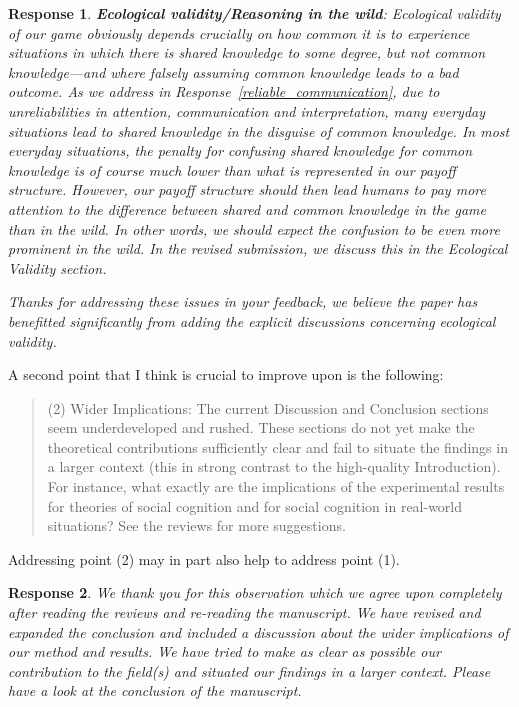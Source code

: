\documentclass[a4paper]{article}
\newtheorem{response}{Response}
\begin{document}
 \begin{response}
{\bfseries Ecological validity/Reasoning in the wild}: Ecological validity of our game obviously depends crucially on how common it is to experience situations in which there is shared knowledge to some degree, but not common knowledge---and where falsely assuming common knowledge leads to a bad outcome. As we address in Response~\ref{reliable_communication}, due to unreliabilities in attention, communication and interpretation, many everyday situations lead to shared knowledge in the disguise of common knowledge. In most everyday situations, the penalty for confusing shared knowledge for common knowledge is of course much lower than what is represented in our payoff structure. However, our payoff structure should then lead humans to pay \emph{more} attention to the difference between shared and common knowledge in the game than in the wild. In other words, we should expect the confusion to be even more prominent in the wild. In the revised submission, we discuss this in the Ecological Validity section. 

Thanks for addressing these issues in your feedback, we believe the paper has benefitted significantly from adding the explicit discussions concerning ecological validity. 
\end{response}

 
A second point that I think is crucial to improve upon is the following:
\begin{quote}
(2)    Wider Implications: The current Discussion and Conclusion sections seem underdeveloped and rushed. These sections do not yet make the theoretical contributions sufficiently clear and fail to situate the findings in a larger context (this in strong contrast to the high-quality Introduction). For instance, what exactly are the implications of the experimental results for theories of social cognition and for social cognition in real-world situations? See the reviews for more suggestions.
\end{quote}
Addressing point (2) may in part also help to address point (1). 

\begin{response}We thank you for this observation which we agree upon completely after reading the reviews and re-reading the manuscript. We have revised and expanded the conclusion and included a discussion about the wider implications of our method and results. We have tried to make as clear as possible our contribution to the field(s) and situated our findings in a larger context. Please have a look at the conclusion of the manuscript. 
\end{response}
\end{document}

